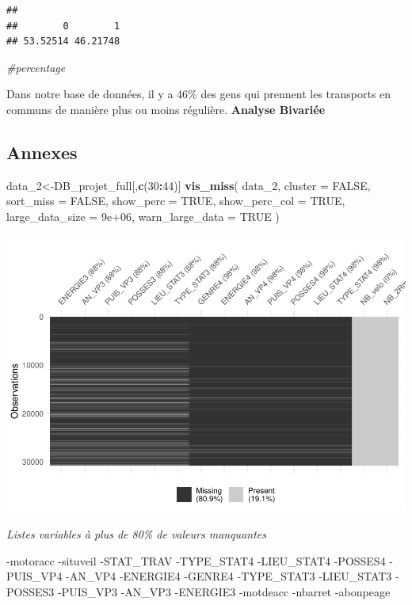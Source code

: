 \documentclass[
]{article}
\newenvironment{Shaded}{\begin{snugshade}}{\end{snugshade}}
\newcommand{\AttributeTok}[1]{\textcolor[rgb]{0.13,0.29,0.53}{#1}}
\newcommand{\CommentTok}[1]{\textcolor[rgb]{0.56,0.35,0.01}{\textit{#1}}}
\newcommand{\ConstantTok}[1]{\textcolor[rgb]{0.56,0.35,0.01}{#1}}
\newcommand{\DecValTok}[1]{\textcolor[rgb]{0.00,0.00,0.81}{#1}}
\newcommand{\FloatTok}[1]{\textcolor[rgb]{0.00,0.00,0.81}{#1}}
\newcommand{\FunctionTok}[1]{\textcolor[rgb]{0.13,0.29,0.53}{\textbf{#1}}}
\newcommand{\NormalTok}[1]{#1}
\newcommand{\OtherTok}[1]{\textcolor[rgb]{0.56,0.35,0.01}{#1}}
\newcommand{\SpecialCharTok}[1]{\textcolor[rgb]{0.81,0.36,0.00}{\textbf{#1}}}
\begin{document}
\begin{verbatim}
## 
##        0        1 
## 53.52514 46.21748
\end{verbatim}

\begin{Shaded}
\begin{Highlighting}[]
\CommentTok{\#percentage}
\end{Highlighting}
\end{Shaded}

Dans notre base de données, il y a 46\% des gens qui prennent les
transports en communs de manière plus ou moins régulière.
\textbf{Analyse Bivariée}

\newpage

\hypertarget{annexes}{%
\subsection{Annexes}\label{annexes}}

\begin{Shaded}
\begin{Highlighting}[]
\NormalTok{data\_2}\OtherTok{\textless{}{-}}\NormalTok{DB\_projet\_full[,}\FunctionTok{c}\NormalTok{(}\DecValTok{30}\SpecialCharTok{:}\DecValTok{44}\NormalTok{)]}
\FunctionTok{vis\_miss}\NormalTok{(}
\NormalTok{  data\_2,}
  \AttributeTok{cluster =} \ConstantTok{FALSE}\NormalTok{,}
  \AttributeTok{sort\_miss =} \ConstantTok{FALSE}\NormalTok{,}
  \AttributeTok{show\_perc =} \ConstantTok{TRUE}\NormalTok{,}
  \AttributeTok{show\_perc\_col =} \ConstantTok{TRUE}\NormalTok{,}
  \AttributeTok{large\_data\_size =} \FloatTok{9e+06}\NormalTok{,}
  \AttributeTok{warn\_large\_data =} \ConstantTok{TRUE}
\NormalTok{)}
\end{Highlighting}
\end{Shaded}

\includegraphics{Projet_Flo_2_files/figure-latex/unnamed-chunk-16-1.pdf}

\emph{Listes variables à plus de 80\% de valeurs manquantes}

-motoracc -situveil -STAT\_TRAV -TYPE\_STAT4 -LIEU\_STAT4 -POSSES4
-PUIS\_VP4 -AN\_VP4 -ENERGIE4 -GENRE4 -TYPE\_STAT3 -LIEU\_STAT3 -POSSES3
-PUIS\_VP3 -AN\_VP3 -ENERGIE3 -motdeacc -nbarret -abonpeage
\end{document}
